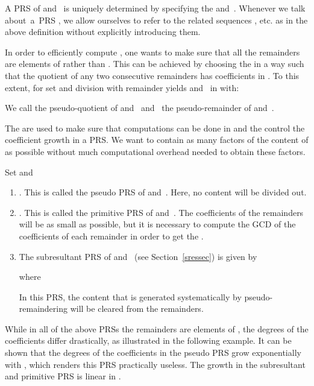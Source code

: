 \documentclass[3p,11pt,preprint]{elsarticle}
\begin{document}
A PRS of  and~ is uniquely determined by specifying the  and~. Whenever we talk about~a~PRS , we allow ourselves to refer to the related sequences ,  etc. as in the above definition without explicitly introducing them. 

In order to efficiently compute , one wants to make sure that all the remainders are elements of  rather than . This can be achieved by choosing the  in a way such that the quotient of any two consecutive remainders has coefficients in . To this extent, for  set  and division with remainder yields  and~ in  with:

We call  the pseudo-quotient of  and~ and~ the pseudo-remainder of  and~.

The  are used to make sure that computations can be done in  and the  control the coefficient growth in a PRS. We want  to contain as many factors of the content of  as possible without much computational overhead needed to obtain these factors.

\begin{example}
\label{prsex}
 Set  and
\begin{enumerate}
 \item . This is called the pseudo PRS of  and~. Here, no content will be divided out.
 \item . This is called the primitive PRS of  and~. The coefficients of the remainders will be as small as possible, but it is necessary to compute the GCD of the coefficients of each remainder in order to get the .
 \item \label{sresprs}The subresultant PRS of  and~ (see Section~\ref{sressec}) is given by

where

In this PRS, the content that is generated systematically by pseudo-remaindering will be cleared from the remainders.
\end{enumerate}
\end{example}

While in all of the above PRSs the remainders are elements of , the degrees of the coefficients differ drastically, as illustrated in the following example. It can be shown that the degrees of the coefficients in the pseudo PRS grow exponentially with , which renders this PRS practically useless. The growth in the subresultant and primitive PRS is linear in .
\end{document}
